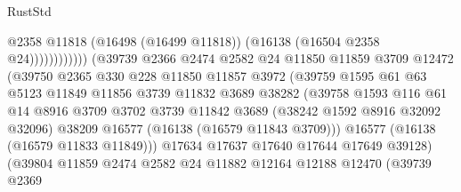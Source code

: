 \begin{lexlean}{RustStd}
\begin{coremodule}
                                              @2358
                                              @11818
                                              (@16498 (@16499 @11818))
                                              (@16138 (@16504 @2358 @24))))))))))))
                          (@39739
                            @2366
                            @2474
                            @2582
                            @24
                            @11850
                            @11859
                            @3709
                            @12472
                            (@39750
                              @2365
                              @330
                              @228
                              @11850
                              @11857
                              @3972
                              (@39759
                                @1595
                                @61
                                @63
                                @5123
                                @11849
                                @11856
                                @3739
                                @11832
                                @3689
                                @38282
                                (@39758
                                  @1593
                                  @116
                                  @61
                                  @14
                                  @8916
                                  @3709
                                  @3702
                                  @3739
                                  @11842
                                  @3689
                                  (@38242 @1592 @8916 @32092 @32096)
                                  @38209
                                  @16577
                                  (@16138 (@16579 @11843 @3709)))
                                @16577
                                (@16138 (@16579 @11833 @11849)))
                              @17634
                              @17637
                              @17640
                              @17644
                              @17649
                              @39128)
                            (@39804
                              @11859
                              @2474
                              @2582
                              @24
                              @11882
                              @12164
                              @12188
                              @12470
                              (@39739
                                @2369

\end{coremodule}
\end{lexlean}
